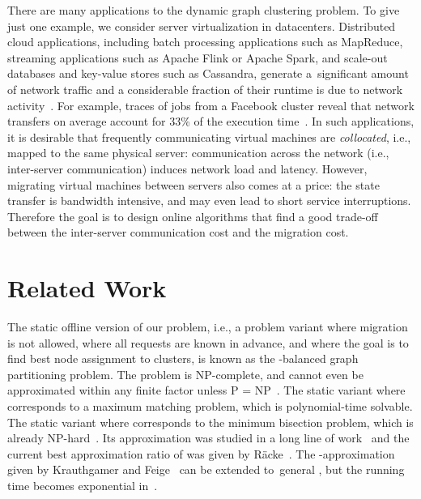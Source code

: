 \documentclass{siamart190516}
\begin{document}
There are many applications to the dynamic graph clustering problem.
To give just one example, we consider server virtualization in
datacenters. Distributed cloud applications, including batch processing
applications such as MapReduce, streaming applications such as Apache Flink or
Apache Spark, and scale-out databases and key-value stores such as Cassandra,
generate a~significant amount of network traffic and a considerable fraction
of their runtime is due to network activity~\cite{MogPop12}. For example,
traces of jobs from a Facebook cluster reveal that network transfers on
average account for 33\% of the execution time~\cite{ChZMJS11}. In such
applications, it is desirable that frequently communicating virtual machines
are \emph{collocated}, i.e., mapped to the same physical server: 
communication across the network (i.e., inter-server communication) induces
network load and latency. However, migrating virtual machines between servers
also comes at a price: the state transfer is bandwidth intensive, and may even
lead to short service interruptions. Therefore the goal is to design online
algorithms that find a good trade-off between the inter-server communication
cost and the migration cost.




\section{Related Work}\label{sec:relwork}

The static offline version of our problem, i.e., a problem variant where
migration is not allowed, where all requests are known in advance, and where
the goal is to find best node assignment to  clusters, is known as the
-balanced graph partitioning problem. The problem is 
NP-complete, and cannot even be approximated within any finite factor unless P
= NP~\cite{AndRae06}. The static variant where  corresponds to a
maximum matching problem, which is polynomial-time solvable. The static
variant where  corresponds to the minimum bisection problem, which
is already NP-hard~\cite{GaJoSt76}. Its approximation was studied in a long
line of work~\cite{SarVaz95,ArKaKa99,FeKrNi00,FeiKra02,KraFei06,Raec08} and
the current best approximation ratio of  was given by
R{\"{a}}cke~\cite{Raec08}. The -approximation given by
Krauthgamer and Feige~\cite{KraFei06} can be extended to~general , but
the running time becomes exponential in~.
\end{document}
